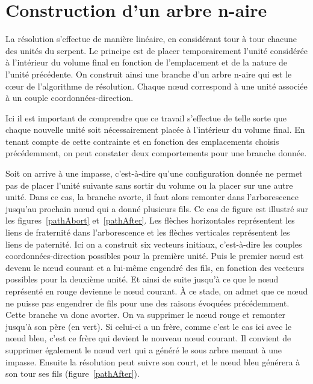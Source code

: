 \clearpage
\section{Construction d’un arbre n-aire}\label{solveNode}
La résolution s’effectue de manière linéaire, en considérant tour à tour chacune des unités du serpent. Le principe est de placer temporairement l’unité considérée à l’intérieur du volume final en fonction de l’emplacement et de la nature de l’unité précédente. On construit ainsi une branche d’un arbre n-aire qui est le cœur de l’algorithme de résolution. Chaque nœud correspond à une unité associée à un couple coordonnées-direction.

Ici il est important de comprendre que ce travail s’effectue de telle sorte que chaque nouvelle unité soit nécessairement placée à l’intérieur du volume final. En tenant compte de cette contrainte et en fonction des emplacements choisis précédemment, on peut constater deux comportements pour une branche donnée.

Soit on arrive à une impasse, c’est-à-dire qu’une configuration donnée ne permet pas de placer l’unité suivante sans sortir du volume ou la placer sur une autre unité. Dans ce cas, la branche avorte, il faut alors remonter dans l’arborescence jusqu’au prochain nœud qui a donné plusieurs fils. Ce cas de figure est illustré sur les figures~\ref{pathAbort} et~\ref{pathAfter}. Les flèches horizontales représentent les liens de fraternité dans l’arborescence et les flèches verticales représentent les liens de paternité. Ici on a construit six vecteurs initiaux, c’est-à-dire les couples coordonnées-direction possibles pour la première unité. Puis le premier nœud est devenu le nœud courant et a lui-même engendré des fils, en fonction des vecteurs possibles pour la deuxième unité. Et ainsi de suite jusqu’à ce que le nœud représenté en rouge devienne le nœud courant. À ce stade, on admet que ce nœud ne puisse pas engendrer de fils pour une des raisons évoquées précédemment. Cette branche va donc avorter. On va supprimer le nœud rouge et remonter jusqu’à son père (en vert). Si celui-ci a un frère, comme c’est le cas ici avec le nœud bleu, c’est ce frère qui devient le nouveau nœud courant. Il convient de supprimer également le nœud vert qui a généré le sous arbre menant à une impasse.  Ensuite la résolution peut suivre son court, et le nœud bleu générera à son tour ses fils (figure~\ref{pathAfter}).

